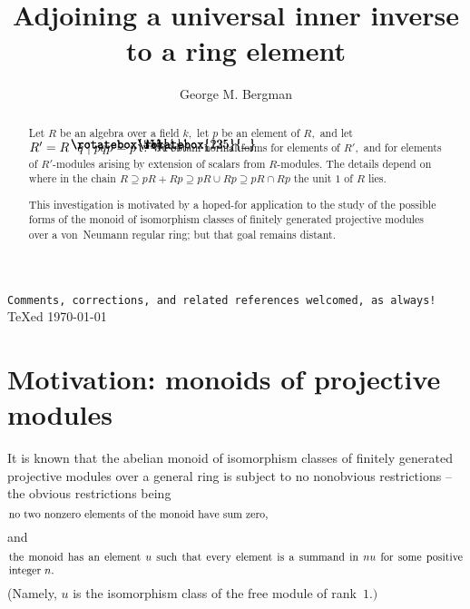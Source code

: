 \documentclass{amsart}
\DeclareRobustCommand{\lang}{\begin{picture}(5,7)
\put(1.2,2.5){\rotatebox{45}{\line(1,0){6.0}}}
\put(1.2,2.5){\rotatebox{315}{\line(1,0){6.0}}}
\end{picture}\kern.16em}
\DeclareRobustCommand{\rang}{\kern.1em\begin{picture}(5,7)
\put(.1,2.5){\rotatebox{135}{\line(1,0){6.0}}}
\put(.1,2.5){\rotatebox{225}{\line(1,0){6.0}}}
\end{picture}}
\begin{document}
\begin{center}
\texttt{Comments, corrections, and related references welcomed,
as always!}\\[.5em]
{\TeX}ed \today
\vspace{2em}
\end{center}

\title[Universal inner inverses]{Adjoining a universal inner inverse to a ring element}

\author{George M. Bergman}
\address{University of California\\
Berkeley, CA 94720-3840, USA}

\begin{abstract}
Let $R$ be an algebra over a field $k,$ let $p$ be an element
of $R,$ and let $R'=R\lang q\mid pqp=\nolinebreak p\rang.$
We obtain normal forms for elements of $R',$ and for elements
of $\!R'\!$-modules arising by extension of scalars
from $\!R\!$-modules.
The details depend on where in the
chain $R \supseteq pR + Rp \supseteq pR\cup Rp \supseteq pR\cap Rp$
the unit $1$ of $R$ lies.

This investigation is motivated by a hoped-for application
to the study of the possible forms of the monoid of isomorphism
classes of finitely generated projective modules over a von~Neumann
regular ring; but that goal remains distant.
\end{abstract}
\maketitle

\section{Motivation: monoids of projective modules}\label{S.motivation}
It is known that the abelian monoid of isomorphism classes
of finitely generated projective modules over a general ring is subject
to no nonobvious restrictions -- the obvious restrictions being
\begin{equation}\begin{minipage}[c]{35pc}\label{d.conical}
no two nonzero elements of the monoid have sum zero,
\end{minipage}\end{equation}
and
\begin{equation}\begin{minipage}[c]{35pc}\label{d.o-}
the monoid has an element $u$
such that every element is a summand in $nu$ for
some positive integer $n.$
\end{minipage}\end{equation}
(Namely, $u$ is the isomorphism class of the free module of rank~$1.)$
\end{document}

